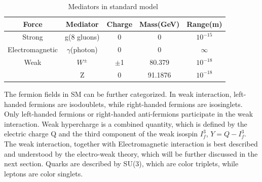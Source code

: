 \begin{table}[htp]
\caption{Mediators in standard model~\cite{Griffiths:111880}}
\begin{center}
\begin{tabular}{|c|c|c|c|c|}
\hline
Force & Mediator & Charge & Mass(GeV) & Range(m)   \\\hline
Strong                & g(8 gluons)                  & 0 & 0 & $10^{-15}$   \\\hline
Electromagnetic & $\gamma$(photon)     & 0 & 0 &   $\infty$   \\\hline
Weak                  &  $W^{\pm}$                &$\pm$1 & 80.379 &$10^{-18}$\\
                           & Z                                &  0         & 91.1876 &  $10^{-18}$ \\\hline
\end{tabular}
\end{center}
\label{Mediator_infor}
\end{table}%


The fermion fields in SM can be further categorized. In weak interaction, left-handed fermions are isodoublets, while right-handed fermions are isosinglets. Only left-handed fermions or right-handed anti-fermions participate in the weak interaction. Weak hypercharge is a combined quantity, which is defined by the electric charge Q and the third component of the weak isospin $I^{3}_{f}$, $Y=Q-I^{3}_{f}$. The weak interaction, together with Electromagnetic interaction is best described and understood by the electro-weak theory, which will be further discussed in the next section.  Quarks are described by SU(3), which are color triplets, while leptons are color singlets.   

